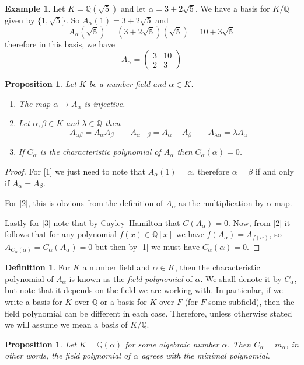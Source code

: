 \documentclass[11pt,a4paper]{report}
\theoremstyle{plain}
\newtheorem{prop}[subsection]{Proposition}
\theoremstyle{definition}
\newtheorem{defn}[subsection]{Definition}
\newtheorem{exmp}[subsection]{Example}
\theoremstyle{definition}
\def\QQ{\mathbb{Q}}
\def \a{\alpha}
\def \lam {\lambda}
\newcommand{\matrd}[4]{\begin{pmatrix}#1&#2\\#3&#4\end{pmatrix}}
\begin{document}
	\begin{exmp}
		Let $K=\QQ(\sqrt{5})$ and let $\a=3+2\sqrt{5}$.  We have a basis for $K/\QQ$ given by $\{1,\sqrt{5}\}.$ So $A_\a(1)=3+2\sqrt{5}$ and \[A_\a(\sqrt{5})=(3+2\sqrt{5})(\sqrt{5})=10+3\sqrt{5}\] therefore in this basis, we have \[A_\a=\matrd{3}{10}{2}{3}\]
	\end{exmp}
	
	\begin{prop}Let $K$ be a number field and $\a \in K$.
		\begin{enumerate}
			\item[1] The map $\a \to A_\a$ is injective.
			\item[2] Let $\a,\beta \in K$ and $\lam \in \QQ$ then \[A_{\a \beta}=A_{\a}A_{\beta} \qquad A_{\a+\beta}=A_\a+ A_\beta \qquad A_{\lam \a}=\lam A_\a\]
			\item[3] If $C_\a$ is the characteristic polynomial of $A_\a$ then $C_\a(\a)=0$.
		\end{enumerate}
	\end{prop}
	
	\begin{proof}
		For [1] we just need to note that $A_\a(1)=\a$, therefore $\a=\beta$ if and only if $A_\a=A_\beta$.
		
		For [2], this is obvious from the definition of $A_\a$ as the multiplication by $\a$ map.
		
		Lastly for [3] note that by Cayley--Hamilton that $C(A_\a)=0$. Now, from [2] it follows that for any polynomial $f(x) \in \QQ[x]$ we have $f(A_\a)=A_{f(\a)}$, so $A_{C_\a(\a)}=C_\a(A_\a)=0$ but then by [1] we must have $C_\a(\a)=0$. 
		
	\end{proof}
	
	\begin{defn}
		For $K$ a number field and $\a \in K$, then the characteristic polynomial of $A_\a$ is known as the \textit{field polynomial} of $\a$. We shall denote it by $C_\a$, but note that it depends on the field we are working with. In particular, if we write a basis for $K$ over $\QQ$ or a basis for $K$ over $F$ (for $F$ some subfield), then the field polynomial can be different in each case. Therefore, unless otherwise stated we will assume we mean a basis of $K/\QQ$.
	\end{defn}
	
	\begin{prop}\label{prop: field pol min pol}
		Let $K=\QQ(\a)$ for some algebraic number $\a$. Then $C_\a=m_\a$, in other words, the field polynomial of $\a$ agrees with the minimal polynomial.
	\end{prop}
	
\end{document}
